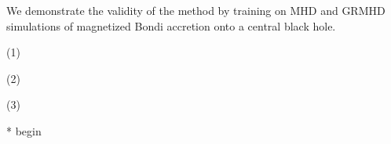 \documentclass{article}
\begin{document}
We demonstrate the validity of the method by training on MHD and GRMHD simulations of magnetized Bondi accretion onto a central black hole.


(1) 

(2)

(3)

* begin 


\end{document}
